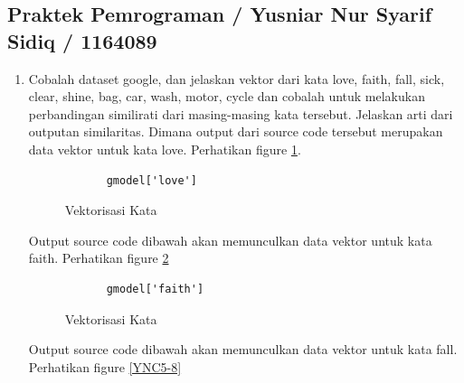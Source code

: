 \subsection{Praktek Pemrograman / Yusniar Nur Syarif Sidiq / 1164089}
\begin{enumerate}
\item Cobalah dataset google, dan jelaskan vektor dari kata love, faith, fall, sick, clear, shine, bag, car, wash, motor, cycle dan cobalah untuk melakukan perbandingan similirati dari masing-masing kata tersebut. Jelaskan arti dari outputan similaritas.
	\subitem Dimana output dari source code tersebut merupakan data vektor untuk kata love. Perhatikan figure \ref{YNC5-6}.

		\begin{verbatim}
			gmodel['love']
		\end{verbatim}

		\begin{figure}[!htbp]
			\caption{Vektorisasi Kata}
			\label{YNC5-6}
		\end{figure}

Output source code dibawah akan memunculkan data vektor untuk kata faith. Perhatikan figure \ref{YNC5-7}

		\begin{verbatim}
			gmodel['faith']
		\end{verbatim}

		\begin{figure}[!htbp]
			\caption{Vektorisasi Kata}
			\label{YNC5-7}
		\end{figure}

Output source code dibawah akan memunculkan data vektor untuk kata fall. Perhatikan figure \ref{YNC5-8}


\end{enumerate}
